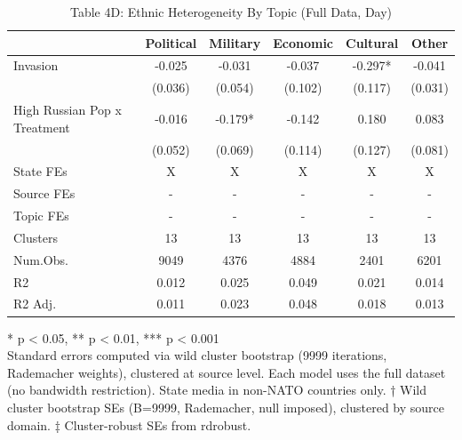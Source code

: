\begin{table}[t]
\caption{\label{tab:table4d}Table 4D: Ethnic Heterogeneity By Topic (Full Data, Day)} 
\fontsize{12.0pt}{14.0pt}\selectfont
\begin{tabular*}{\linewidth}{@{\extracolsep{\fill}}lccccc}
\toprule
  & Political & Military & Economic & Cultural & Other \\ 
\midrule\addlinespace[2.5pt]
Invasion & -0.025 & -0.031 & -0.037 & -0.297* & -0.041 \\ 
 & (0.036) & (0.054) & (0.102) & (0.117) & (0.031) \\ 
High Russian Pop x Treatment & -0.016 & -0.179* & -0.142 & 0.180 & 0.083 \\ 
{} & {(0.052)} & {(0.069)} & {(0.114)} & {(0.127)} & {(0.081)} \\ 
State FEs & X & X & X & X & X \\ 
Source FEs & - & - & - & - & - \\ 
Topic FEs & - & - & - & - & - \\ 
Clusters & 13 & 13 & 13 & 13 & 13 \\ 
Num.Obs. & 9049 & 4376 & 4884 & 2401 & 6201 \\ 
R2 & 0.012 & 0.025 & 0.049 & 0.021 & 0.014 \\ 
R2 Adj. & 0.011 & 0.023 & 0.048 & 0.018 & 0.013 \\ 
\bottomrule
\end{tabular*}
\begin{minipage}{\linewidth}
\vspace{.05em}
* p < 0.05, ** p < 0.01, *** p < 0.001\\
Standard errors computed via wild cluster bootstrap (9999 iterations, Rademacher
weights), clustered at source level. Each model uses the full dataset (no
bandwidth restriction). State media in non-NATO countries only. † Wild cluster
bootstrap SEs (B=9999, Rademacher, null imposed), clustered by source domain. ‡
Cluster-robust SEs from rdrobust.\\
\end{minipage}
\end{table}

